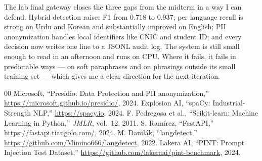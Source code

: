 \documentclass[conference]{IEEEtran}
\begin{document}
The lab final gateway closes the three gaps from the midterm in a way I
can defend. Hybrid detection raises F1 from $0.718$ to $0.937$; per
language recall is strong on Urdu and Korean and substantially improved
on English; PII anonymization handles local identifiers like CNIC and
student ID; and every decision now writes one line to a JSONL audit log.
The system is still small enough to read in an afternoon and runs on
CPU. Where it fails, it fails in predictable ways --- on soft
paraphrases and on phrasings outside its small training set --- which
gives me a clear direction for the next iteration.

\begin{thebibliography}{00}
 Microsoft, ``Presidio: Data Protection and PII anonymization,'' \url{https://microsoft.github.io/presidio/}, 2024.
    Explosion AI, ``spaCy: Industrial-Strength NLP,'' \url{https://spacy.io}, 2024.
  F. Pedregosa et al., ``Scikit-learn: Machine Learning in Python,'' \emph{JMLR}, vol.~12, 2011.
  S. Ramírez, ``FastAPI,'' \url{https://fastapi.tiangolo.com/}, 2024.
 M. Danilák, ``langdetect,'' \url{https://github.com/Mimino666/langdetect}, 2022.
   Lakera AI, ``PINT: Prompt Injection Test Dataset,'' \url{https://github.com/lakeraai/pint-benchmark}, 2024.
\end{thebibliography}
\end{document}
